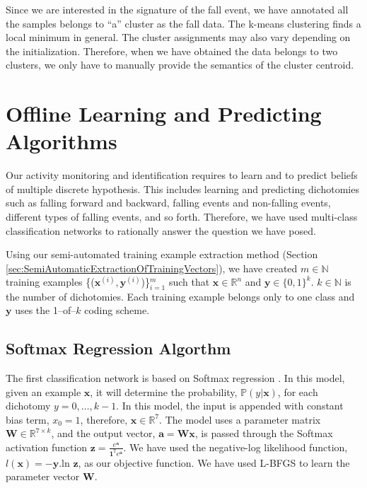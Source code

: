 \documentclass{IEEEtran}
\begin{document}
Since we are 
interested in the signature of the fall event, we have annotated all the samples belongs 
to ``a'' cluster as the fall data. The k-means clustering finds a 
local minimum in general. The cluster assignments may also vary depending on the 
initialization. Therefore, when we have obtained the data belongs to two clusters, we 
only have to manually provide the semantics of the cluster centroid. 

\section{Offline Learning and Predicting Algorithms}
\label{OffLineLearning}


Our activity monitoring and identification requires to learn and to predict beliefs of 
multiple 
discrete hypothesis. This includes learning and predicting dichotomies such as falling 
forward and 
backward, falling events and non-falling events, different types of falling events, and 
so forth. 
Therefore, 
we have used multi-class classification networks to rationally answer the question we 
have posed.

Using our semi-automated training example extraction method (Section 
\ref{sec:SemiAutomaticExtractionOfTrainingVectors}), we have created $m \in 
\mathbb{N}$ 
training examples 
\{($\mathbf{x}^{(i)}, \mathbf{y}^{(i)}$)\}$_{i=1}^m$ such that $\mathbf{x} \in 
\mathbb{R}^{n}$ 
and 
$\mathbf{y} \in 
\{0,1\}^k$. $k \in 
\mathbb{N}$ is the number of dichotomies. Each training example belongs only to one class 
and $\mathbf{y}$ uses the 1--of--$k$ coding scheme.    

\subsection{Softmax Regression Algorthm}
\label{sec:SoftmaxRegrationAlgorthm}

The first classification network is based on Softmax regression \cite{Bishop06a}. In this 
model, given an 
example $\mathbf{x}$, it will determine the probability, $\mathbb{P}(y | \mathbf{x})$, 
for 
each dichotomy $y=0,\ldots,k-1$. In this model, the input is appended with constant bias 
term, $x_0 = 1$, therefore, $\mathbf{x} \in \mathbb{R}^7$. The model uses a parameter 
matrix 
$\mathbf{W} 
\in \mathbb{R}^{7 \times k}$, and the output vector, $\mathbf{a} = \mathbf{Wx}$, is 
passed 
through 
the 
Softmax 
activation function $\mathbf{z} = \frac{e^{\mathbf{a}}}{\mathbf{1}^\mathtt{T} 
e^{\mathbf{a}}}$. We have 
used the negative-log likelihood function, $l(\mathbf{x}) = -\mathbf{y}$.ln $\mathbf{z}$, 
as our 
objective function. We have used L-BFGS \cite{DBLP:conf/icml/LeNCLPN11} to learn the 
parameter vector $\mathbf{W}$.  
\end{document}
